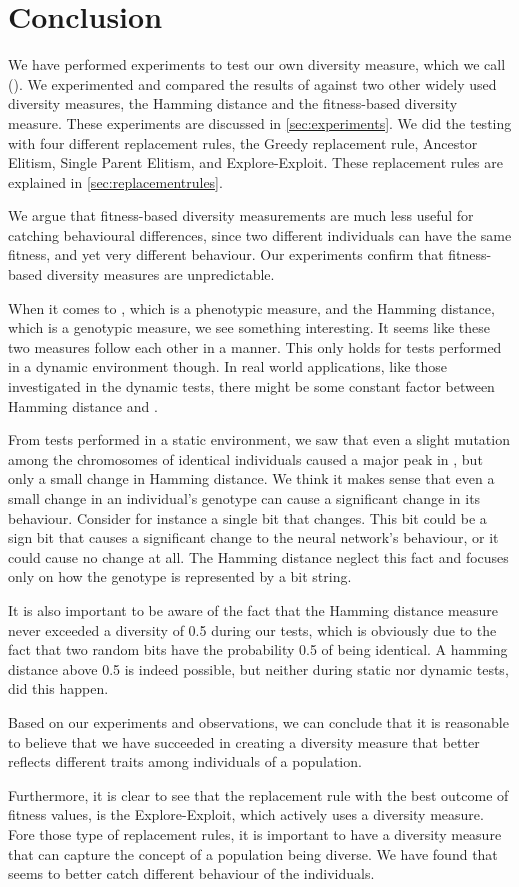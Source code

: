 \section{Conclusion}\label{sec:conclusion}

We have performed experiments to test our own diversity measure, which we call \di{} (\dia{}). We experimented and compared the results of \dia{} against two other widely used diversity measures, the Hamming distance and the fitness-based diversity measure. These experiments are discussed in \cref{sec:experiments}. We did the testing with four different replacement rules, the Greedy replacement rule, Ancestor Elitism, Single Parent Elitism, and Explore-Exploit. These replacement rules are explained in \cref{sec:replacementrules}.

We argue that fitness-based diversity measurements are much less useful for catching behavioural differences, since two different individuals can have the same fitness, and yet very different behaviour. Our experiments confirm that fitness-based diversity measures are unpredictable.

When it comes to \dia{}, which is a phenotypic measure, and the Hamming distance, which is a genotypic measure, we see something interesting. It seems like these two measures follow each other in a manner. This only holds for tests performed in a dynamic environment though. 
In real world applications, like those investigated in the dynamic tests, there might be some constant factor between Hamming distance and \dia{}.

From tests performed in a static environment, we saw that even a slight mutation among the chromosomes of identical individuals caused a major peak in \dia{}, but only a small change in Hamming distance.
We think it makes sense that even a small change in an individual's genotype can cause a significant change in its behaviour. Consider for instance a single bit that changes. This bit could be a sign bit that causes a significant change to the neural network's behaviour, or it could cause no change at all. The Hamming distance neglect this fact and focuses only on how the genotype is represented by a bit string.

It is also important to be aware of the fact that the Hamming distance measure never exceeded a diversity of \num{0.5} during our tests, which is obviously due to the fact that two random bits have the probability \num{0.5} of being identical.
A hamming distance above \num{0.5} is indeed possible, but neither during static nor dynamic tests, did this happen. 

Based on our experiments and observations, we can conclude that it is reasonable to believe that we have succeeded in creating a diversity measure that better reflects different traits among individuals of a population.

Furthermore, it is clear to see that the replacement rule with the best outcome of fitness values, is the Explore-Exploit, which actively uses a diversity measure. Fore those type of replacement rules, it is important to have a diversity measure that can capture the concept of a population being diverse. We have found that \dia{} seems to better catch different behaviour of the individuals.
